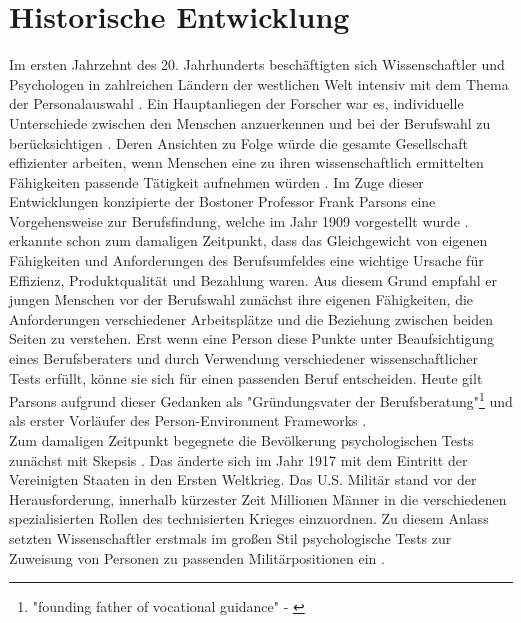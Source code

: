 \section{Historische Entwicklung}
\label{ch:personEnvironmentFit:historisches}
Im ersten Jahrzehnt des 20. Jahrhunderts beschäftigten sich Wissenschaftler und Psychologen in zahlreichen Ländern der westlichen Welt intensiv mit dem Thema der Personalauswahl \cite[S. 1]{salgado:2001}. Ein Hauptanliegen der Forscher war es, individuelle Unterschiede zwischen den Menschen anzuerkennen und bei der Berufswahl zu berücksichtigen \cite[S. 2ff.]{stern:1900}. Deren Ansichten zu Folge würde die gesamte Gesellschaft effizienter arbeiten, wenn Menschen eine zu ihren wissenschaftlich ermittelten Fähigkeiten passende Tätigkeit aufnehmen würden \cite[S.2]{kevles:1968}\cite[S. 3]{parsons:1909}. Im Zuge dieser Entwicklungen konzipierte der Bostoner Professor Frank Parsons eine Vorgehensweise zur Berufsfindung, welche im Jahr 1909 vorgestellt wurde \cite[S. 1]{su:2015}. \textcite[S. 5ff.]{parsons:1909} erkannte schon zum damaligen Zeitpunkt, dass das Gleichgewicht von eigenen Fähigkeiten und Anforderungen des Berufsumfeldes eine wichtige Ursache für Effizienz, Produktqualität und Bezahlung waren. Aus diesem Grund empfahl er jungen Menschen vor der Berufswahl zunächst ihre eigenen Fähigkeiten, die Anforderungen verschiedener Arbeitsplätze und die Beziehung zwischen beiden Seiten zu verstehen. Erst wenn eine Person diese Punkte unter Beaufsichtigung eines Berufsberaters und durch Verwendung verschiedener wissenschaftlicher Tests erfüllt, könne sie sich für einen passenden Beruf entscheiden. Heute gilt Parsons aufgrund dieser Gedanken als "Gründungsvater der Berufsberatung"\footnote{"founding father of vocational guidance" - \textcite[S. 3]{porfeli:2009}} \cite[S. 3]{porfeli:2009} und als erster Vorläufer des Person-Environment Frameworks \cite[S. 2]{edwards:2008}.\\
Zum damaligen Zeitpunkt begegnete die Bevölkerung psychologischen Tests zunächst mit Skepsis \cite[S. 2]{kevles:1968}. Das änderte sich im Jahr 1917 mit dem Eintritt der Vereinigten Staaten in den Ersten Weltkrieg. Das U.S. Militär stand vor der Herausforderung, innerhalb kürzester Zeit Millionen Männer in die verschiedenen spezialisierten Rollen des technisierten Krieges einzuordnen. Zu diesem Anlass setzten Wissenschaftler erstmals im großen Stil psychologische Tests zur Zuweisung von Personen zu passenden Militärpositionen ein \cite[S. 2ff.]{kevles:1968}. \\
